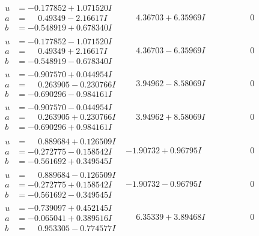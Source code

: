 \documentclass[1p]{elsarticle_modified}
\theoremstyle{definition}
\begin{document}
$$\begin{array}{c|c|c}
\begin{aligned}
u &= -0.177852 + 1.071520 I \\
a &= \phantom{-}0.49349 - 2.16617 I \\
b &= -0.548919 + 0.678340 I\end{aligned}
 & \phantom{-}4.36703 + 6.35969 I & \phantom{-0.000000 } 0 \\ \hline\begin{aligned}
u &= -0.177852 - 1.071520 I \\
a &= \phantom{-}0.49349 + 2.16617 I \\
b &= -0.548919 - 0.678340 I\end{aligned}
 & \phantom{-}4.36703 - 6.35969 I & \phantom{-0.000000 } 0 \\ \hline\begin{aligned}
u &= -0.907570 + 0.044954 I \\
a &= \phantom{-}0.263905 - 0.230766 I \\
b &= -0.690296 - 0.984161 I\end{aligned}
 & \phantom{-}3.94962 - 8.58069 I & \phantom{-0.000000 } 0 \\ \hline\begin{aligned}
u &= -0.907570 - 0.044954 I \\
a &= \phantom{-}0.263905 + 0.230766 I \\
b &= -0.690296 + 0.984161 I\end{aligned}
 & \phantom{-}3.94962 + 8.58069 I & \phantom{-0.000000 } 0 \\ \hline\begin{aligned}
u &= \phantom{-}0.889684 + 0.126509 I \\
a &= -0.272775 - 0.158542 I \\
b &= -0.561692 + 0.349545 I\end{aligned}
 & -1.90732 + 0.96795 I & \phantom{-0.000000 } 0 \\ \hline\begin{aligned}
u &= \phantom{-}0.889684 - 0.126509 I \\
a &= -0.272775 + 0.158542 I \\
b &= -0.561692 - 0.349545 I\end{aligned}
 & -1.90732 - 0.96795 I & \phantom{-0.000000 } 0 \\ \hline\begin{aligned}
u &= -0.739097 + 0.452145 I \\
a &= -0.065041 + 0.389516 I \\
b &= \phantom{-}0.953305 - 0.774577 I\end{aligned}
 & \phantom{-}6.35339 + 3.89468 I & \phantom{-0.000000 } 0 \\ \hline\begin{aligned}

\end{aligned}
\end{array}$$
\end{document}
